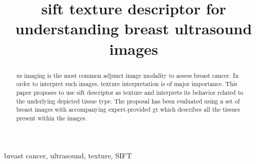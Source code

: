 \documentclass[a4paper, 10pt, conference]{llncs}      %
\title{\acs{sift} texture descriptor for understanding breast ultrasound images}
\author{}
\begin{document}
\frontmatter
\pagestyle{empty}

\mainmatter  %





%



\maketitle








\begin{abstract}
\ac{us} imaging is the most common adjunct image modality to assess breast cancer. In order to interpret such images, texture interpretation is of major importance. This paper proposes to use \acf{sift} descriptor as texture and interprets its behavior related to the underlying depicted tissue type. The proposal has been evaluated using a set of breast images with accompanying expert-provided \acf{gt} which describes all the tissues present within the images.
\end{abstract}
%
\begin{keywords}
breast cancer, ultrasound, texture, SIFT
\end{keywords}
%
\end{document}
